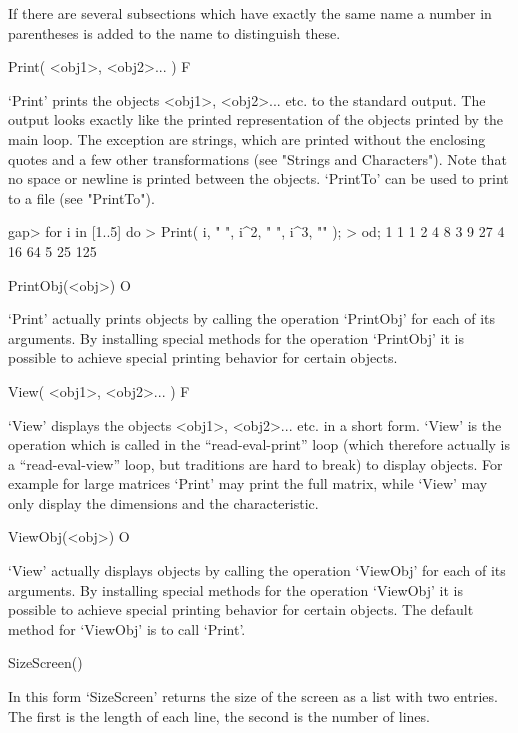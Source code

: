 If there are several subsections which have exactly the same name a number
in parentheses is added to the name to distinguish these.


\>Print( <obj1>, <obj2>... ) F

`Print' prints the objects <obj1>, <obj2>... etc. to the standard output.
The output looks exactly like the printed representation of the objects
printed by the main loop. The exception are strings, which are printed
without the enclosing quotes and a few other transformations (see
"Strings and Characters"). Note that no space or newline is printed
between the objects. `PrintTo' can be used to print to a file (see
"PrintTo").

\beginexample
gap> for i in [1..5] do
> Print( i, " ", i^2, " ", i^3, "\n" );
> od;
1 1 1
2 4 8
3 9 27
4 16 64
5 25 125 
\endexample

\>PrintObj(<obj>) O

`Print' actually prints objects by calling the operation
`PrintObj' for each of its arguments.
By installing special methods for the operation `PrintObj'
it is possible to achieve special printing behavior for certain objects.


\>View( <obj1>, <obj2>... ) F

`View' displays the objects <obj1>, <obj2>... etc. in a short form. `View' is
the operation which is called in the ``read-eval-print'' loop (which
therefore actually is a ``read-eval-view'' loop, but traditions are hard to
break) to display objects. For example for large matrices `Print' may print
the full matrix, while `View' may only display the dimensions and the
characteristic.

\>ViewObj(<obj>) O

`View' actually displays objects by calling the operation
`ViewObj' for each of its arguments. By installing special methods for the
operation `ViewObj' it is possible to achieve special printing behavior
for certain objects. The default method for `ViewObj' is to call `Print'.


\>SizeScreen()

In this form `SizeScreen' returns the size of the screen as a list with
two entries. The first is the length of each line, the second is the
number of lines.

